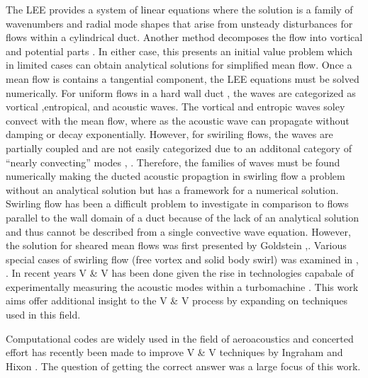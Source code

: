 The LEE provides a system of linear equations where the solution is a family of wavenumbers and radial mode shapes that arise from 
unsteady disturbances for flows within a cylindrical duct.  Another method 
decomposes the flow into vortical and potential parts \cite{golubev1996sound}.
In either case, this presents an initial value problem which 
in limited cases can obtain analytical solutions for simplified mean flow. Once a mean flow 
is contains a tangential component, the LEE equations must be solved numerically.  
For uniform flows in a hard wall duct , the waves are categorized as vortical 
,entropical, and acoustic waves. The vortical and entropic waves soley convect with 
the mean flow, where as the acoustic wave can propagate without damping or decay 
exponentially.  However, for swiriling flows, the waves are partially coupled
and are not easily categorized due to an additonal category of ``nearly convecting'' 
modes \cite{Kerrebrock2012},\cite{KERREBROCK1974} . 
Therefore, the families of waves must be found numerically \cite{Envia2004}
making the ducted acoustic propagtion in swirling flow a problem without
an analytical solution but has a framework for a numerical solution.
Swirling flow has been a difficult problem to investigate in comparison to 
flows parallel to the wall domain of a duct \cite{COOPER2001} because of the 
lack of an analytical solution and thus cannot be described from a single convective 
wave equation. However, the solution for sheared mean flows was first presented
by Goldstein \cite{Goldstein1978},\cite{Goldstein1979}. Various special cases of
swirling flow (free vortex and solid body swirl) was examined in \cite{KAPUR1973}
\cite{Kerrebrock2012}, \cite{KERREBROCK1974}. In recent years V \& V has been 
done given the rise in technologies capabale of experimentally
measuring the acoustic modes within a turbomachine \cite{Maldonado2016}. This
work aims offer additional insight to the V \& V process 
by expanding on techniques used in this field.  

Computational codes are widely used in the field of aeroacoustics and concerted
effort has recently been made to improve V \& V techniques 
by Ingraham and Hixon \cite{Ingraham2015,Ingraham2010}. The question of getting 
the correct answer was a large focus of this work. 


